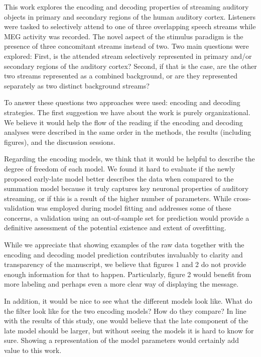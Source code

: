 \documentclass[10pt]{article}
\begin{document}
This work explores the encoding and decoding properties of streaming
auditory objects in primary and secondary regions of the human auditory
cortex. Listeners were tasked to selectively attend to one of three
overlapping speech streams while MEG activity was recorded. The novel
aspect of the stimulus paradigm is the presence of three concomitant
streams instead of two. Two main questions were explored: First, is the
attended stream selectively represented in primary and/or secondary
regions of the auditory cortex? Second, if that is the case, are the
other two streams represented as a combined background, or are they
represented separately as two distinct background streams?

To answer these questions two approaches were used: encoding and
decoding strategies. The first suggestion we have about the work is
purely organizational. We believe it would help the flow of the reading
if the encoding and decoding analyses were described in the same order
in the methods, the results (including figures), and the discussion
sessions.

Regarding the encoding models, we think that it would be helpful to
describe the degree of freedom of each model. We found it hard to
evaluate if the newly proposed early-late model better describes the
data when compared to the summation model because it truly captures key
neuronal properties of auditory streaming, or if this is a result of the
higher number of parameters. While cross-validation was employed during
model fitting and addresses some of these concerns, a validation using
an out-of-sample set for prediction would provide a definitive
assessment of the potential existence and extent of overfitting.

While we appreciate that showing examples of the raw data together with
the encoding and decoding model prediction contributes invaluably to
clarity and transparency of the manuscript, we believe that figures 1
and 2 do not provide enough information for that to happen.
Particularly, figure 2 would benefit from more labeling and perhaps even
a more clear way of displaying the message.

In addition, it would be nice to see what the different models look
like. What do the filter look like for the two encoding models? How do
they compare? In line with the results of this study, one would believe
that the late component of the late model should be larger, but without
seeing the models it is hard to know for sure. Showing a representation
of the model parameters would certainly add value to this work.
\end{document}
